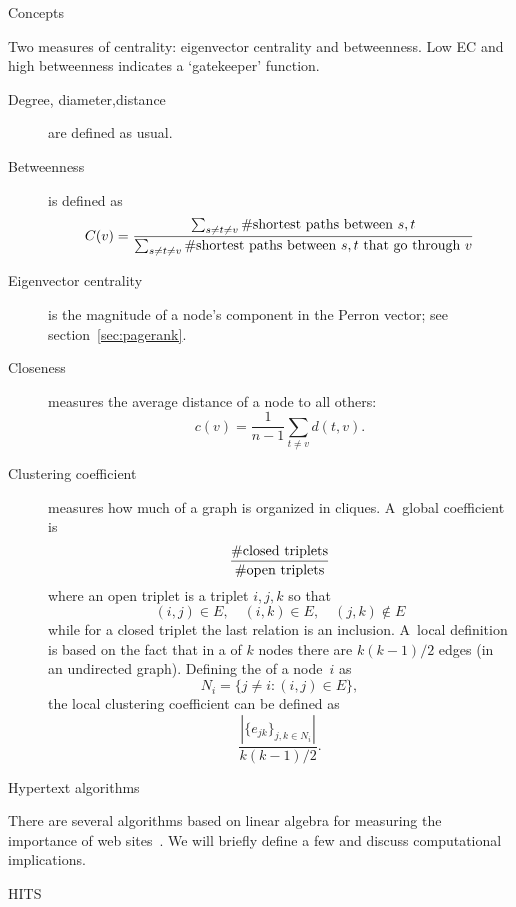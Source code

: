 \begin{notready}
 {Concepts}

Two measures of centrality: eigenvector centrality and
betweenness. Low EC and high betweenness indicates a `gatekeeper'
function.

\begin{description}
  \item[Degree, diameter,distance] are defined as usual.
  \item[Betweenness]%
    is defined as 
    \[ C(v)=\frac
       {\sum_{s\not=t\not=v} \#\hbox{shortest paths between $s,t$}}
       {\sum_{s\not=t\not=v} \#\hbox{shortest paths between $s,t$ that go through $v$}}
    \]
  \item[Eigenvector centrality] is the magnitude of a node's component
    in the Perron vector; see section~\ref{sec:pagerank}.
  \item[Closeness] measures the average distance of a node to all
    others:
    \[ c(v) = \frac{1}{n-1}\sum_{t\not=v}d(t,v). \]
  \item[Clustering coefficient] measures how much of a graph is
    organized in cliques. A~global coefficient is
    \[ \frac{\#\hbox{closed triplets}}{\#\hbox{open triplets}} \]
    where an open triplet is a triplet $i,j,k$ so that
    \[ (i,j)\in E,\quad (i,k)\in E, \quad (j,k)\not\in E \]
    while for a closed triplet the last relation is an
    inclusion. A~local definition is based on the fact that in a
     of $k$ nodes there are $k(k-1)/2$ edges (in an
    undirected graph). Defining the  of a
    node~$i$ as 
    \[ N_i=\{j\not=i\colon (i,j)\in E\}, \]
    the local clustering coefficient can be defined as 
    \[ \frac{|\{e_{jk}\}_{j,k\in N_i}|}{k(k-1)/2}. \]
\end{description}
\end{notready}

 {Hypertext algorithms}
\label{sec:pagerank}

There are several algorithms based on linear algebra
for measuring the importance of web
sites~\cite{Langville2005eigenvector}. We will briefly define a few
and discuss computational implications.

 {HITS}

